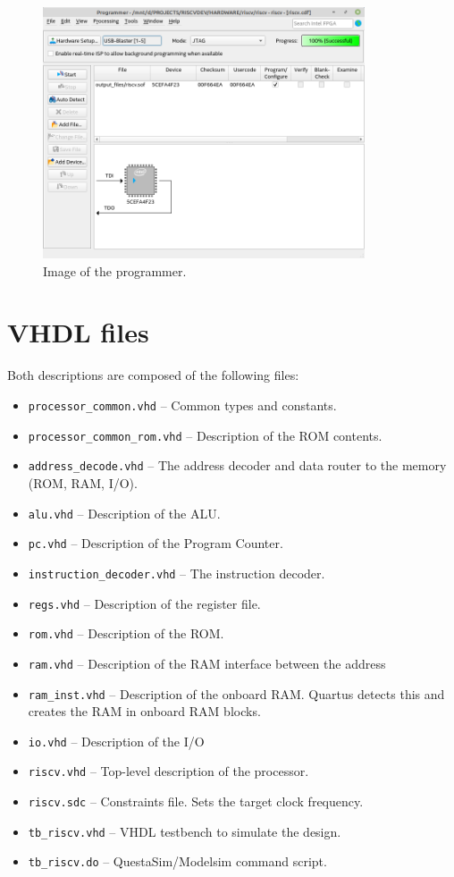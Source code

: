 \documentclass[12pt]{article}
\begin{document}
\begin{itemize}
\begin{figure}[!ht]
\centering
\includegraphics[width=0.85\textwidth]{programmer}
\caption{Image of the programmer.}
\label{programmer}
\end{figure}

\end{itemize}

\section{VHDL files}
Both descriptions are composed of the following files:

\begin{itemize}
\item \lstinline|processor_common.vhd| -- Common types and constants.
\item \lstinline|processor_common_rom.vhd| -- Description of the ROM contents.
\item \lstinline|address_decode.vhd| -- The address decoder and data router to the memory (ROM, RAM, I/O).
\item \lstinline|alu.vhd| -- Description of the ALU.
\item \lstinline|pc.vhd| -- Description of the Program Counter.
\item \lstinline|instruction_decoder.vhd| -- The instruction decoder.
\item \lstinline|regs.vhd| -- Description of the register file.
\item \lstinline|rom.vhd| -- Description of the ROM.
\item \lstinline|ram.vhd| -- Description of the RAM interface between the address 
\item \lstinline|ram_inst.vhd| -- Description of the onboard RAM. Quartus detects this and creates the RAM in onboard RAM blocks.
\item \lstinline|io.vhd| -- Description of the I/O
\item \lstinline|riscv.vhd| -- Top-level description of the processor.
\item \lstinline|riscv.sdc| -- Constraints file. Sets the target clock frequency.
\item \lstinline|tb_riscv.vhd| -- VHDL testbench to simulate the design.
\item \lstinline|tb_riscv.do| -- QuestaSim/Modelsim command script.
\end{itemize}
\end{document}
